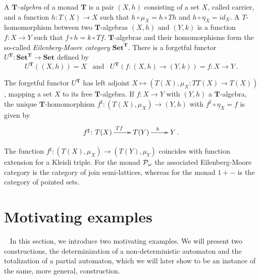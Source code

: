 \documentclass{LMCS}
\def\pow#1{{\mathcal P_\omega}#1}
\def\T{\mathbf{T}}
\def\Set{\mathbf{Set}}
\begin{document}
\medskip

A $\T$\emph{-algebra} of a monad $\T$ is a pair $(X,h)$ consisting of a set $X$, called
carrier, and a function $h\colon T(X) \rightarrow X$  such that $h \circ \mu_X = h \circ Th$
and $h \circ \eta_X = id_X$. A $T$-homomorphism between two $\T$-algebras $(X,h)$ and $(Y,k)$
is a function $f\colon X \to Y$ such that $f \circ h = k \circ Tf$. $\T$-algebras and their
homomorphisms form the so-called \emph{Eilenberg-Moore category}
$\Set^\T$. There is a forgetful
functor $U^\T\colon\Set^\T \to \Set$ defined by
\[
U^\T((X,h)) = X
\;\;\;\mbox{and}\;\;\;
U^\T(f\colon(X,h)\rightarrow (Y,k)) = f\colon X \rightarrow Y \,.
\]


The forgetful functor $U^\T$ has left adjoint $X \mapsto (T(X),\mu_X\colon TT(X) \to T(X))$,
mapping a set $X$ to its free $\T$-algebra. If $f \colon X \rightarrow Y$ with $(Y,h)$
a $\T$-algebra, the unique $\T$-homomorphism $f^\sharp \colon (T(X), \mu_X) \rightarrow (Y, h)$
with $f^\sharp \circ \eta_X = f$ is given by
\[
\xymatrix{
f^\sharp\colon T(X) \ar[r]^{Tf} & T(Y) \ar[r]^{h} & Y \,.
}
\]


The function $f^\sharp\colon (T(X), \mu_X) \rightarrow (T(Y), \mu_Y)$ coincides with
function extension for a Kleisli triple.
For the monad $\pow$ the associated Eilenberg-Moore category is the category of
join semi-lattices, whereas for the monad $1+-$ is the category of pointed sets.
\section{Motivating examples}~\label{sec:motiv}
In this section, we introduce two motivating examples. We will present two constructions,  the determinization of a non-deterministic
automaton and the totalization of a partial automaton, which we will later show to be an instance of the same, more general, construction.
\end{document}
